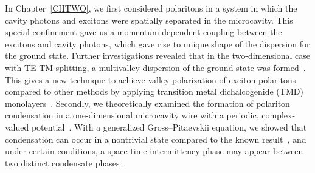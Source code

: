 In Chapter~\ref{CHTWO}, we first considered polaritons in a system in which the cavity photons and excitons were spatially separated in the microcavity.
This special confinement gave us a momentum-dependent coupling between the excitons and cavity photons, which gave rise to unique shape of the dispersion for the ground state.
Further investigations revealed that in the two-dimensional case with TE-TM splitting, a multivalley-dispersion of the ground state was formed~\cite{Sun:2017ab}.
This gives a new technique to achieve valley polarization of exciton-polaritons compared to other methods by applying transition metal dichalcogenide (TMD) monolayers~\cite{Krol:2019aa,Dufferwiel:2017aa,Sun:2017ct}.
Secondly, we theoretically examined the formation of polariton condensation in a one-dimensional microcavity wire with a periodic, complex-valued potential~\cite{Yoon:2019aa}.
With a generalized Gross--Pitaevskii equation, we showed that condensation can occur in a nontrivial state compared to the known result~\cite{Lai:2007aa}, and under certain conditions, a space-time intermittency phase may appear between two distinct condensate phases~\cite{Hecke:1998aa,Chate:1994aa,PhysRevLett.120.033901}.

